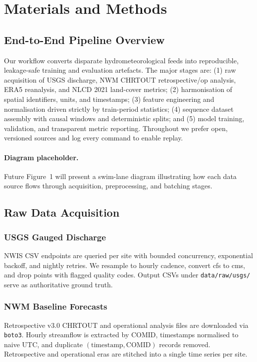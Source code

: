 \documentclass[draft]{agujournal2019}
\begin{document}
\section{Materials and Methods}
\subsection{End-to-End Pipeline Overview}
Our workflow converts disparate hydrometeorological feeds into reproducible, leakage-safe training and evaluation artefacts. The major stages are: (1) raw acquisition of USGS discharge, NWM CHRTOUT retrospective/op analysis, ERA5 reanalysis, and NLCD 2021 land-cover metrics; (2) harmonisation of spatial identifiers, units, and timestamps; (3) feature engineering and normalisation driven strictly by train-period statistics; (4) sequence dataset assembly with causal windows and deterministic splits; and (5) model training, validation, and transparent metric reporting. Throughout we prefer open, versioned sources and log every command to enable replay.

\paragraph{Diagram placeholder.} Future Figure~1 will present a swim-lane diagram illustrating how each data source flows through acquisition, preprocessing, and batching stages.

\subsection{Raw Data Acquisition}
\subsubsection{USGS Gauged Discharge}
NWIS CSV endpoints are queried per site with bounded concurrency, exponential backoff, and nightly retries. We resample to hourly cadence, convert cfs to cms, and drop points with flagged quality codes. Output CSVs under \texttt{data/raw/usgs/} serve as authoritative ground truth.

\subsubsection{NWM Baseline Forecasts}
Retrospective v3.0 CHRTOUT and operational analysis files are downloaded via \texttt{boto3}. Hourly streamflow is extracted by COMID, timestamps normalised to naive UTC, and duplicate \((\text{timestamp},\text{COMID})\) records removed. Retrospective and operational eras are stitched into a single time series per site.
\end{document}
